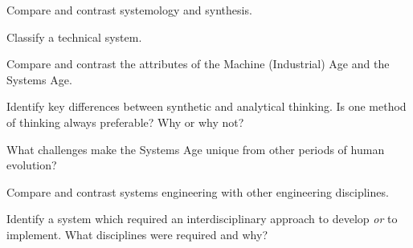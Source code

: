 \begin{exercises}
    \begin{exercise} 
    \label{sea-1-23}
        Compare and contrast systemology and synthesis.
    \end{exercise}
    \begin{solution}
    \end{solution}
    
    \begin{exercise} 
    \label{sea-1-24}
        Classify a technical system.
    \end{exercise}
    \begin{solution}
    \end{solution}
    
    \begin{exercise} 
    \label{sea-1-27}
        Compare and contrast the attributes of the Machine (Industrial) Age and the Systems Age.
    \end{exercise}
    \begin{solution}
    \end{solution}
    
    \begin{exercise} 
    \label{sea-1-28}
        Identify key differences between synthetic and analytical thinking. Is one method of thinking always preferable? Why or why not?
    \end{exercise}
    \begin{solution}
    \end{solution}
    
    \begin{exercise} 
    \label{sea-1-29}
        What challenges make the Systems Age unique from other periods of human evolution?
    \end{exercise}
    \begin{solution}
    \end{solution}
    
    \begin{exercise} 
    \label{sea-1-30}
        Compare and contrast systems engineering with other engineering disciplines.
    \end{exercise}
    \begin{solution}
    \end{solution}
    
    \begin{exercise} 
    \label{sea-1-32}
        Identify a system which required an interdisciplinary approach to develop \textit{or} to implement. What disciplines were required and why?
    \end{exercise}
    \begin{solution}
    \end{solution}
    

\end{exercises}
